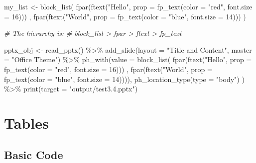 \documentclass[
]{book}
\newenvironment{Shaded}{\begin{snugshade}}{\end{snugshade}}
\newcommand{\AttributeTok}[1]{\textcolor[rgb]{0.77,0.63,0.00}{#1}}
\newcommand{\CommentTok}[1]{\textcolor[rgb]{0.56,0.35,0.01}{\textit{#1}}}
\newcommand{\DecValTok}[1]{\textcolor[rgb]{0.00,0.00,0.81}{#1}}
\newcommand{\FunctionTok}[1]{\textcolor[rgb]{0.00,0.00,0.00}{#1}}
\newcommand{\NormalTok}[1]{#1}
\newcommand{\OtherTok}[1]{\textcolor[rgb]{0.56,0.35,0.01}{#1}}
\newcommand{\SpecialCharTok}[1]{\textcolor[rgb]{0.00,0.00,0.00}{#1}}
\newcommand{\StringTok}[1]{\textcolor[rgb]{0.31,0.60,0.02}{#1}}
\begin{document}
\begin{Shaded}
\begin{Highlighting}[]
\NormalTok{my\_list }\OtherTok{\textless{}{-}} \FunctionTok{block\_list}\NormalTok{(}
  \FunctionTok{fpar}\NormalTok{(}\FunctionTok{ftext}\NormalTok{(}\StringTok{"Hello"}\NormalTok{, }\AttributeTok{prop =} \FunctionTok{fp\_text}\NormalTok{(}\AttributeTok{color =} \StringTok{"red"}\NormalTok{, }\AttributeTok{font.size =} \DecValTok{16}\NormalTok{))) ,}
  \FunctionTok{fpar}\NormalTok{(}\FunctionTok{ftext}\NormalTok{(}\StringTok{"World"}\NormalTok{, }\AttributeTok{prop =} \FunctionTok{fp\_text}\NormalTok{(}\AttributeTok{color =} \StringTok{"blue"}\NormalTok{, }\AttributeTok{font.size =} \DecValTok{14}\NormalTok{))) )}

\CommentTok{\# The hierarchy is:}
\CommentTok{\# block\_list \textgreater{} fpar \textgreater{} ftext \textgreater{} fp\_text}

\NormalTok{pptx\_obj }\OtherTok{\textless{}{-}} \FunctionTok{read\_pptx}\NormalTok{() }\SpecialCharTok{\%\textgreater{}\%}
  \FunctionTok{add\_slide}\NormalTok{(}\AttributeTok{layout =} \StringTok{"Title and Content"}\NormalTok{, }\AttributeTok{master =} \StringTok{"Office Theme"}\NormalTok{) }\SpecialCharTok{\%\textgreater{}\%}
  \FunctionTok{ph\_with}\NormalTok{(}\AttributeTok{value =} \FunctionTok{block\_list}\NormalTok{(}
    \FunctionTok{fpar}\NormalTok{(}\FunctionTok{ftext}\NormalTok{(}\StringTok{"Hello"}\NormalTok{, }\AttributeTok{prop =} \FunctionTok{fp\_text}\NormalTok{(}\AttributeTok{color =} \StringTok{"red"}\NormalTok{, }\AttributeTok{font.size =} \DecValTok{16}\NormalTok{))) ,}
    \FunctionTok{fpar}\NormalTok{(}\FunctionTok{ftext}\NormalTok{(}\StringTok{"World"}\NormalTok{, }\AttributeTok{prop =} \FunctionTok{fp\_text}\NormalTok{(}\AttributeTok{color =} \StringTok{"blue"}\NormalTok{, }\AttributeTok{font.size =} \DecValTok{14}\NormalTok{)))),}
    \FunctionTok{ph\_location\_type}\NormalTok{(}\AttributeTok{type =} \StringTok{"body"}\NormalTok{)}
\NormalTok{  ) }\SpecialCharTok{\%\textgreater{}\%}
  \FunctionTok{print}\NormalTok{(}\AttributeTok{target =} \StringTok{"output/test3.4.pptx"}\NormalTok{) }
\end{Highlighting}
\end{Shaded}

\hypertarget{tables-1}{%
\section{Tables}\label{tables-1}}

\hypertarget{basic-code}{%
\subsection{Basic Code}\label{basic-code}}
\end{document}
